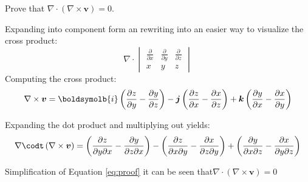 Prove that $\nabla \cdot \left(\nabla \times \boldsymbol{v}\right)=0$.

Expanding into component form an rewriting into an easier way to visualize the cross product:
\begin{equation}
	\nabla\cdot 
	\begin{vmatrix}
		\frac{\partial}{\partial x} & \frac{\partial}{\partial y} & \frac{\partial}{\partial z}\\
		x&y&z
	\end{vmatrix}
\end{equation}
Computing the cross product:
\begin{equation}
\nabla \times \boldsymbol{v}= \boldsymolb{i}\left(\frac{\partial z}{\partial y}-\frac{\partial y}{\partial z}\right)-\boldsymbol{j}\left(\frac{\partial z}{\partial x}-\frac{\partial x}{\partial z}\right)+\boldsymbol{k}\left(\frac{\partial y}{\partial x}-\frac{\partial x}{\partial y}\right)
\end{equation}

Expanding the dot product and multiplying out yields:
\begin{equation}
\nabla\codt\left(\nabla \times \boldsymbol{v}\right)= \left(\frac{\partial z}{\partial y \partial x}-\frac{\partial y}{\partial z \partial x}\right)-\left(\frac{\partial z}{\partial x \partial y}-\frac{\partial x}{\partial z \partial y}\right)+\left(\frac{\partial y}{\partial x \partial z}-\frac{\partial x}{\partial y \partial z}\right)
\label{eq:proof}
\end{equation}

Simplification of Equation \ref{eq:proof}  it can be seen that$\nabla \cdot \left(\nabla \times \boldsymbol{v}\right)=0$